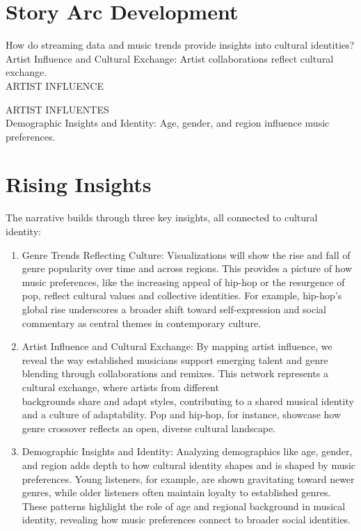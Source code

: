 \documentclass[12pt]{article}
\begin{document}
\section*{Story Arc Development}
How do streaming data and music trends provide insights into cultural identities?\\
Artist Influence and Cultural Exchange: Artist collaborations reflect cultural exchange.\\
ARTIST INFLUENCE\\

ARTIST INFLUENTES\\
Demographic Insights and Identity: Age, gender, and region influence music preferences.

\section*{Rising Insights}
The narrative builds through three key insights, all connected to cultural identity:

\begin{enumerate}
  \item Genre Trends Reflecting Culture: Visualizations will show the rise and fall of genre popularity over time and across regions. This provides a picture of how music preferences, like the increasing appeal of hip-hop or the resurgence of pop, reflect cultural values and collective identities. For example, hip-hop's global rise underscores a broader shift toward self-expression and social commentary as central themes in contemporary culture.
  \item Artist Influence and Cultural Exchange: By mapping artist influence, we reveal the way established musicians support emerging talent and genre blending through collaborations and remixes. This network represents a cultural exchange, where artists from different\\
backgrounds share and adapt styles, contributing to a shared musical identity and a culture of adaptability. Pop and hip-hop, for instance, showcase how genre crossover reflects an open, diverse cultural landscape.
  \item Demographic Insights and Identity: Analyzing demographics like age, gender, and region adds depth to how cultural identity shapes and is shaped by music preferences. Young listeners, for example, are shown gravitating toward newer genres, while older listeners often maintain loyalty to established genres. These patterns highlight the role of age and regional background in musical identity, revealing how music preferences connect to broader social identities.
\end{enumerate}
\end{document}
